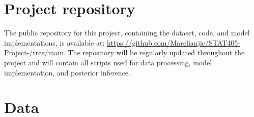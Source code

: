 \documentclass[a4paper,11pt]{article}
\author{
Marc Shi (56215593) \\
Yu Chang (47945050) \\
\small \texttt{lianjies@student.ubc.ca} \\
\small \texttt{changy72@student.ubc.ca}\\
\small Department of Statistics \\
The University of British Columbia \\
}
\title{\vspace{-\baselineskip}\mytitle}
\date{\today}
\begin{document}
\maketitle
\thispagestyle{fancy}
\section{Project repository}
The public repository for this project, containing the dataset, code, and model implementations, is available at:
\url{https://github.com/Marclianjie/STAT405-Project-/tree/main}.
The repository will be regularly updated throughout the project and will contain all scripts used for data processing, model implementation, and posterior inference.

\section{Data}
\end{document}
